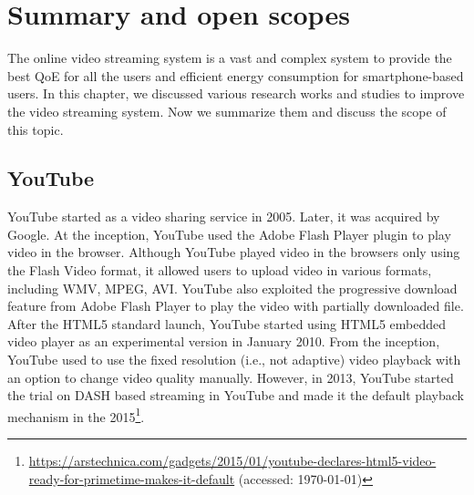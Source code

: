 \section{Summary and open scopes}
The online video streaming system is a vast and complex system to provide the best QoE for all the users and efficient energy consumption for smartphone-based users. In this chapter, we discussed various research works and studies to improve the video streaming system. Now we summarize them and discuss the scope of this topic.

\subsection{YouTube}
YouTube started as a video sharing service in 2005. Later, it was acquired by Google. At the inception, YouTube used the Adobe Flash Player plugin to play video in the browser. Although YouTube played video in the browsers only using the Flash Video format, it allowed users to upload video in various formats, including WMV, MPEG, AVI. YouTube also exploited the progressive download feature from Adobe Flash Player to play the video with partially downloaded file\cite{gill2007youtube}. After the HTML5 standard launch, YouTube started using HTML5 embedded video player as an experimental version in January 2010. From the inception, YouTube used to use the fixed resolution (i.e., not adaptive) video playback with an option to change video quality manually.
However, in 2013, YouTube started the trial on DASH based streaming in YouTube and made it the default playback mechanism in the 2015\footnote{\url{https://arstechnica.com/gadgets/2015/01/youtube-declares-html5-video-ready-for-primetime-makes-it-default} (accessed: \today)}.

